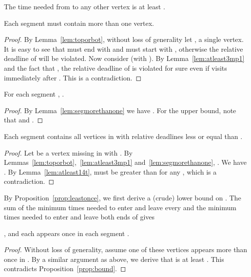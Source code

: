 \documentclass[envcountsame]{llncs}
\begin{document}
\begin{lemma}\label{lem:atleast14t}
The time needed from  to any other vertex is at least .
\end{lemma}


\begin{lemma}\label{lem:segmorethanone}
Each segment  must contain more than one vertex.
\end{lemma}
\begin{proof}
By Lemma~\ref{lem:toporbot}, without loss of generality let , a single vertex. It is easy to see
that  must end with  and  must start with , otherwise
the relative deadline of  will be violated. Now consider  (with ).
By Lemma~\ref{lem:atleast3mp1} and the fact that ,
the relative deadline of  is violated for sure even if  visits 
immediately after . This is a contradiction.
\end{proof}

\begin{proposition}\label{prop:bound}
For each segment , .
\end{proposition}
\begin{proof}
By Lemma~\ref{lem:segmorethanone} we have .
For the upper bound, note that 
and .
\end{proof}

\begin{proposition}\label{prop:leastonce}
Each segment  contains all vertices in  with relative deadlines less or equal than .
\end{proposition}
\begin{proof}
Let  be a vertex missing in  with 
. By Lemmas~\ref{lem:toporbot},~\ref{lem:atleast3mp1} and~\ref{lem:segmorethanone},
.
We have .
By Lemma~\ref{lem:atleast14t},  must be greater than 
for any , which is a contradiction.
\end{proof}

By Proposition~\ref{prop:leastonce}, we first derive a (crude) lower bound on .
The sum of the minimum times needed to enter and leave every  and
the minimum times needed to enter and leave both ends of  gives


\begin{proposition}\label{prop:tbonce}
,  and each  appears once in each segment .
\end{proposition}
\begin{proof}
Without loss of generality, assume one of these vertices appears more than once in .
By a similar argument as above, we derive that  is at least .
This contradicts Proposition~\ref{prop:bound}.
\end{proof}
\end{document}

